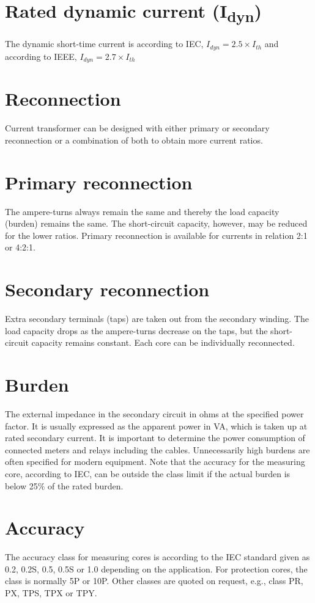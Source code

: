 \section*{Rated dynamic current (I\textsubscript{dyn})}
The dynamic short-time current is according to IEC, $I_{dyn} = 2.5 \times I_{th}$ and according to IEEE, $I_{dyn} = 2.7 \times I_{th}$

\section*{Reconnection}
Current transformer can be designed with either primary or secondary reconnection or a combination of both to obtain more current ratios.
\section*{Primary reconnection}
The ampere-turns always remain the same and thereby the load capacity (burden) remains the same. The short-circuit capacity, however, may be reduced for the lower ratios. Primary reconnection is available for currents in relation 2:1 or 4:2:1.
\section*{Secondary reconnection}
Extra secondary terminals (taps) are taken out from the secondary winding. The load capacity drops as the ampere-turns decrease on the taps, but the short-circuit capacity remains constant. Each core can be individually reconnected.
\section*{Burden}
The external impedance in the secondary circuit in ohms at the specified power factor. It is usually expressed as the apparent power in VA, which is taken up at rated secondary current. It is important to determine the power consumption of connected meters and relays including the cables. Unnecessarily high burdens are often specified for modern equipment. Note that the accuracy for the measuring core, according to IEC, can be outside the class limit if the actual burden is below 25\% of the rated burden.

\section*{Accuracy}
The accuracy class for measuring cores is according to the IEC standard given as 0.2, 0.2S, 0.5, 0.5S or 1.0 depending on the application. For protection cores, the class is normally 5P or 10P. Other classes are quoted on request, e.g., class PR, PX, TPS, TPX or TPY.
